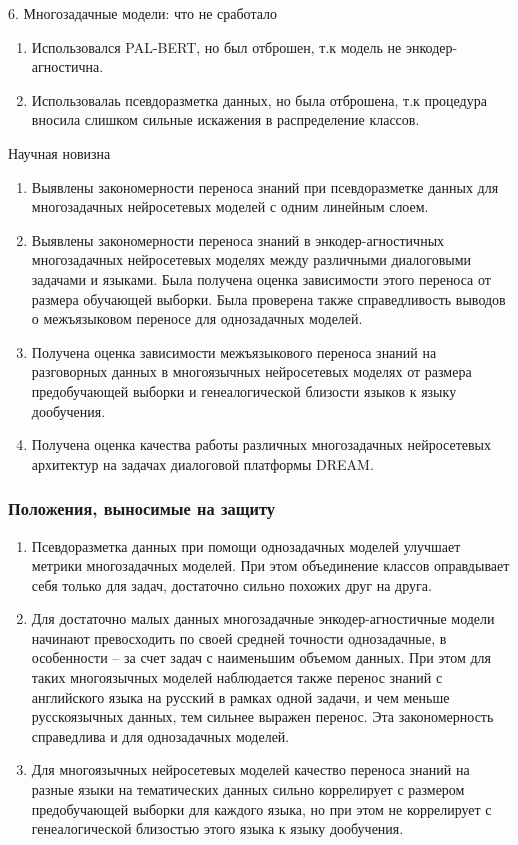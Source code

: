 \begin{frame}{6. Многозадачные модели: что не сработало}
\begin{enumerate}
\item Использовался PAL-BERT, но был отброшен, т.к модель не энкодер-агностична.
\item Использовалаь псевдоразметка данных, но была отброшена, т.к процедура вносила слишком сильные искажения в распределение классов.
\end{enumerate}
\end{frame}


\begin{frame}{Научная новизна}
\begin{enumerate}
  \item {Выявлены закономерности переноса знаний при псевдоразметке данных для многозадачных нейросетевых моделей с одним линейным слоем.}
  \item {Выявлены закономерности переноса знаний в энкодер-агностичных многозадачных нейросетевых моделях между различными диалоговыми задачами и языками. Была получена оценка зависимости этого переноса от размера обучающей выборки. Была проверена также справедливость выводов о межъязыковом переносе для однозадачных моделей.}
  \item {Получена оценка зависимости межъязыкового переноса знаний на разговорных данных в многоязычных нейросетевых моделях от размера предобучающей выборки и генеалогической близости языков к языку дообучения.}
  \item {Получена оценка качества работы различных многозадачных нейросетевых архитектур на задачах диалоговой платформы DREAM.}
\end{enumerate}    
\end{frame}

\begin{frame}
    \frametitle{Положения, выносимые на защиту}
    \begin{enumerate}
  \item {Псевдоразметка данных при помощи однозадачных моделей улучшает метрики многозадачных моделей. При этом объединение классов оправдывает себя только для задач, достаточно сильно похожих друг на друга.}
  \item {Для достаточно малых данных многозадачные энкодер-агностичные модели начинают превосходить по своей средней точности однозадачные, в особенности -- за счет задач с наименьшим объемом данных. При этом для таких многоязычных моделей наблюдается также перенос знаний с английского языка на русский в рамках одной задачи, и чем меньше русскоязычных данных, тем сильнее выражен перенос. Эта закономерность справедлива и для однозадачных моделей.}
  \item {Для многоязычных нейросетевых моделей качество переноса знаний на разные языки на тематических данных сильно коррелирует с размером предобучающей выборки для каждого языка, но при этом не коррелирует с генеалогической близостью этого языка к языку дообучения.}
    \end{enumerate}
\end{frame}

